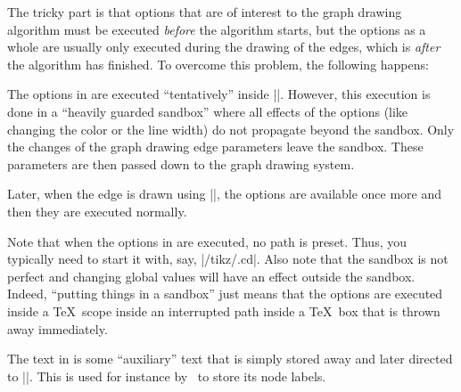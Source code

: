 \begin{command}{\pgfgdedge{}}
    The tricky part is that options that are of interest to the graph drawing
    algorithm must be executed \emph{before} the algorithm starts, but the
    options as a whole are usually only executed during the drawing of the
    edges, which is \emph{after} the algorithm has finished. To overcome this
    problem, the following happens:

    The options in  are executed ``tentatively'' inside
    |\pgfgdedge|. However, this execution is done in a ``heavily guarded
    sandbox'' where all effects of the options (like changing the color or the
    line width) do not propagate beyond the sandbox. Only the changes of the
    graph drawing edge parameters leave the sandbox. These parameters are then
    passed down to the graph drawing system.

    Later, when the edge is drawn using |\pgfgdedgecallback|, the options
     are available once more and then they are executed
    normally.

    Note that when the options in  are executed, no path is
    preset. Thus, you typically need to start it with, say, |/tikz/.cd|. Also
    note that the sandbox is not perfect and changing global values will have
    an effect outside the sandbox. Indeed, ``putting things in a sandbox'' just
    means that the options are executed inside a \TeX\ scope inside an
    interrupted path inside a \TeX\ box that is thrown away immediately.

    The text in  is some ``auxiliary'' text that is simply
    stored away and later directed to |\pgfgdedgecallback|. This is used for
    instance by \tikzname\ to store its node labels.
\end{command}

